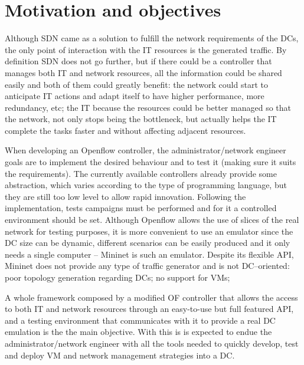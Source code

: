 \documentclass[12pt,english,oneside]{book}
\begin{document}
\section{Motivation and objectives\label{sec:motobj}}
\hspace{0.6cm}

Although SDN came as a solution to fulfill the network requirements of the DCs, the only point of interaction with the IT resources is the generated traffic.
By definition SDN does not go further, but if there could be a controller that manages both IT and network resources, all the information could be shared easily and both of them could greatly benefit: the network could start to anticipate IT actions and adapt itself to have higher performance, more redundancy, etc; the IT because the resources could be better managed so that the network, not only stops being the bottleneck, but actually helps the IT complete the tasks faster and without affecting adjacent resources.

When developing an Openflow controller, the administrator/network engineer goals are to implement the desired behaviour and to test it (making sure it suits the requirements).
The currently available controllers already provide some abstraction, which varies according to the type of programming language, but they are still too low level to allow rapid innovation. 
Following the implementation, tests campaigns must be performed and for it a controlled environment should be set.
Although Openflow allows the use of slices of the real network for testing purposes, it is more convenient to use an emulator since the DC size can be dynamic, different scenarios can be easily produced and it only needs a single computer -- Mininet is such an emulator.
Despite its flexible API, Mininet does not provide any type of traffic generator and is not DC--oriented: poor topology generation regarding DCs; no support for VMs;

A whole framework composed by a modified OF controller that allows the access to both IT and network resources through an easy-to-use but full featured API, and a testing environment that communicates with it to provide a real DC emulation is the the main objective.
With this is is expected to endue the administrator/network engineer with all the tools needed to quickly develop, test and deploy VM and network management strategies into a DC.
\end{document}
